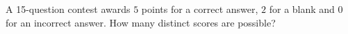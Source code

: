A 15-question contest awards $5$ points for a correct answer, $2$ for a blank and $0$ for an incorrect answer. How many distinct scores are possible?
